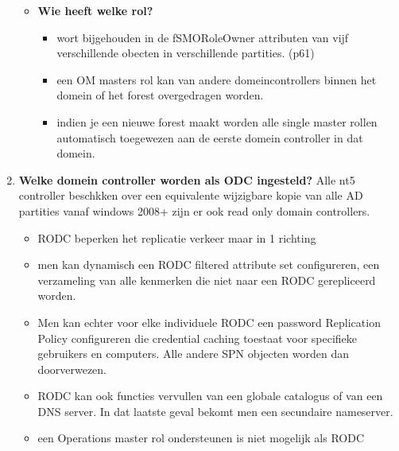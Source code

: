 \begin{enumerate}
\begin{itemize}
\clearpage
\item \textbf{Wie heeft welke rol?}
\begin{itemize}
\item wort bijgehouden in de fSMORoleOwner attributen van vijf verschillende obecten in verschillende partities. (p61)
\item een OM masters rol kan van andere domeincontrollers binnen het domein of het forest overgedragen worden.
\item indien je een nieuwe forest maakt worden alle single master rollen automatisch toegewezen aan de eerste domein controller in dat domein.
\end{itemize}
\end{itemize}

\item \textbf{Welke domein controller worden als ODC ingesteld?}
Alle nt5 controller beschkken over een equivalente wijzigbare kopie van alle AD partities vanaf windows 2008+ zijn er ook read only domain controllers.
\begin{itemize}
\item RODC beperken het replicatie verkeer maar in 1 richting
\item men kan dynamisch een RODC filtered attribute set configureren, een verzameling van alle kenmerken die niet naar een RODC gerepliceerd worden.
\item Men kan echter voor elke individuele RODC een password Replication Policy configureren die credential caching toestaat voor specifieke gebruikers en computers. Alle andere SPN objecten worden dan doorverwezen.
\item RODC kan ook functies vervullen van een globale catalogus of van een DNS server. In dat laatste geval bekomt men een secundaire nameserver.
\item een Operations master rol ondersteunen is niet mogelijk als RODC
\end{itemize}









\end{enumerate}
